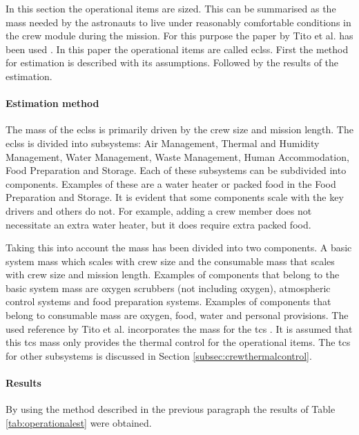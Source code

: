 In this section the operational items are sized. This can be summarised as the mass needed by the astronauts to live under reasonably comfortable conditions in the crew module during the mission. For this purpose the paper by Tito et al. has been used \cite{Tito2013}. In this paper the operational items are called \gls{eclss}. First the method for estimation is described with its assumptions. Followed by the results of the estimation.

\paragraph{Estimation method}
The mass of the \gls{eclss} is primarily driven by the crew size and mission length. The \gls{eclss} is divided into subsystems: Air Management, Thermal and Humidity Management, Water Management, Waste Management, Human Accommodation, Food Preparation and Storage. Each of these subsystems can be subdivided into components. Examples of these are a water heater or packed food in the Food Preparation and Storage. It is evident that some components scale with the key drivers and others do not. For example, adding a crew member does not necessitate an extra water heater, but it does require extra packed food. 


Taking this into account the mass has been divided into two components. A basic system mass which scales with crew size and the consumable mass that scales with crew size and mission length. Examples of components that belong to the basic system mass are oxygen scrubbers (not including oxygen), atmospheric control systems and food preparation systems. Examples of components that belong to consumable mass are oxygen, food, water and personal provisions. The used reference by Tito et al. incorporates the mass for the \gls{tcs} \cite{Tito2013}. It is assumed that this \gls{tcs} mass only provides the thermal control for the operational items. The \gls{tcs} for other subsystems is discussed in Section \ref{subsec:crewthermalcontrol}.

\paragraph{Results}
By using the method described in the previous paragraph the results of Table \ref{tab:operationalest} were obtained.

